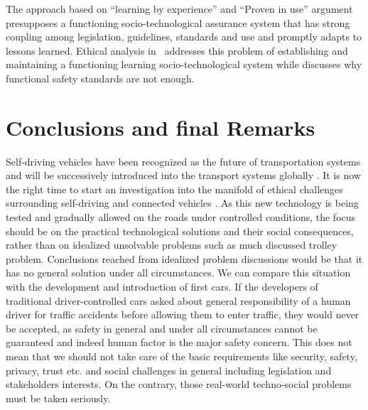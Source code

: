 The approach based on \enquote{learning by experience} and \enquote{Proven in use} argument \cite{GovernmentNL2017,NationalInstruments2014a,DBLP:journals/corr/SchabeB15} presupposes a functioning socio-technological assurance system that has strong coupling among legislation, guidelines, standards and use and promptly adapts to lessons learned. Ethical analysis in~\cite{DodigCrnkovic2012, Thekkilakattil_7273594,Johnsen2017_7958474} addresses this problem of establishing and maintaining a functioning learning socio-technological system while \cite{Johnsen2017_7958474} discusses why functional safety standards are not enough.



\section{Conclusions and final Remarks}
\label{sec:Conclusions}
Self-driving vehicles have been recognized as the future of transportation systems and will be successively introduced into the transport systems globally \cite{EthicsCommission2017pr,Pillath2016,NHTSA2016PolicyUpdate}. It is now the right time to start an investigation into the manifold of ethical challenges surrounding self-driving and connected vehicles \cite{EthicsCommission2017b}. As this new technology is being tested and gradually allowed on the roads under controlled conditions, the focus should be on the practical technological solutions and their social consequences, rather than on idealized unsolvable problems such as much discussed trolley problem. Conclusions reached from idealized problem discussions would be that it has no general solution under all circumstances. We can compare this situation with the development and introduction of first cars. If the developers of traditional driver-controlled cars asked about general responsibility of a human driver for traffic accidents before allowing them to enter traffic, they would never be accepted, as safety in general and under all circumstances cannot be guaranteed and indeed human factor is the major safety concern. This does not mean that we should not take care of the basic requirements like security, safety, privacy, trust etc. and social challenges in general including legislation and stakeholders interests. On the contrary, those real-world techno-social problems must be taken seriously.

